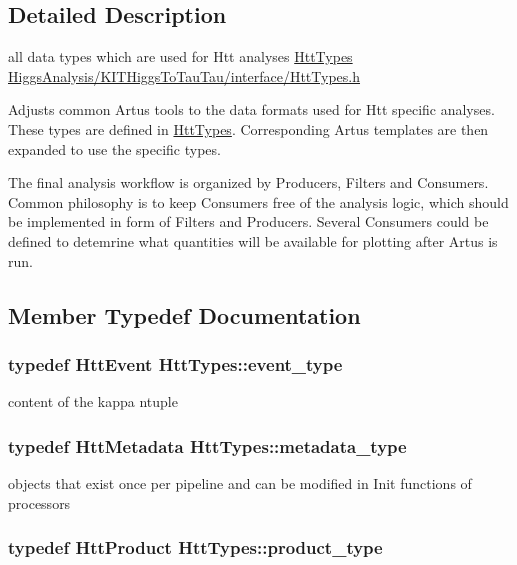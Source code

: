 \subsection{Detailed Description}
all data types which are used for Htt analyses \hyperlink{classHttTypes}{HttTypes} \hyperlink{HttTypes_8h}{HiggsAnalysis/KITHiggsToTauTau/interface/HttTypes.h}

Adjusts common Artus tools to the data formats used for Htt specific analyses. These types are defined in \hyperlink{classHttTypes}{HttTypes}. Corresponding Artus templates are then expanded to use the specific types.

The final analysis workflow is organized by Producers, Filters and Consumers. Common philosophy is to keep Consumers free of the analysis logic, which should be implemented in form of Filters and Producers. Several Consumers could be defined to detemrine what quantities will be available for plotting after Artus is run. 

\subsection{Member Typedef Documentation}
\hypertarget{classHttTypes_ad4519395b176ec8e6c98f2dfedb68b78}{
\subsubsection[{event\_\-type}]{\setlength{\rightskip}{0pt plus 5cm}typedef {\bf HttEvent} {\bf HttTypes::event\_\-type}}}
\label{classHttTypes_ad4519395b176ec8e6c98f2dfedb68b78}


content of the kappa ntuple \hypertarget{classHttTypes_affda9644df5a8e5bf3a5aa6d02e5281b}{
\subsubsection[{metadata\_\-type}]{\setlength{\rightskip}{0pt plus 5cm}typedef {\bf HttMetadata} {\bf HttTypes::metadata\_\-type}}}
\label{classHttTypes_affda9644df5a8e5bf3a5aa6d02e5281b}


objects that exist once per pipeline and can be modified in Init functions of processors \hypertarget{classHttTypes_a498cba01b87a7d48dc0378323f41720c}{
\subsubsection[{product\_\-type}]{\setlength{\rightskip}{0pt plus 5cm}typedef {\bf HttProduct} {\bf HttTypes::product\_\-type}}}
\label{classHttTypes_a498cba01b87a7d48dc0378323f41720c}


